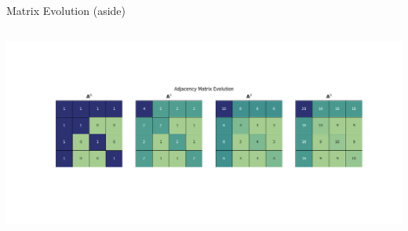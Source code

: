 \begin{frame}{Matrix Evolution \tiny{(aside)}}
\begin{columns}
\begin{column}{.7\textwidth}
\begin{itemize}
            \end{itemize}
        \end{column}
    \end{columns} 
    \bc
        \includegraphics[width=.9\textwidth, clip=True, trim= 1.45in 2.15in 1.45in 1.75in]{../Images/matrix_evo.png}
    \ec    
\end{frame}







